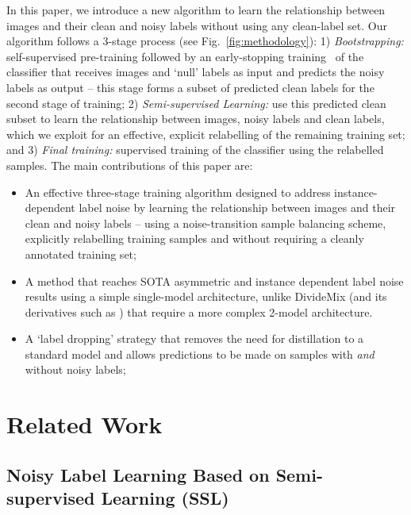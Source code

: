 \documentclass[10pt,twocolumn,letterpaper]{article}
\begin{document}
In this paper, we introduce a new algorithm to learn the relationship between images and their clean and noisy labels without using any clean-label set.
Our algorithm follows a 3-stage process (see Fig.~\ref{fig:methodology}): 
1) \textit{Bootstrapping:} self-supervised pre-training followed by an early-stopping training~\cite{zhang2016understanding} of the classifier that receives images and `null' labels as input and predicts the noisy labels as output -- this stage forms a subset of predicted clean labels for the second stage of training;
2) \textit{Semi-supervised Learning:} use this predicted clean subset to learn the relationship between images, noisy labels and clean labels, which we exploit for an effective, explicit relabelling of the remaining training set;
and 3) \textit{Final training:} supervised training of the classifier using the relabelled samples. The main contributions of this paper are:
\begin{itemize}
    \item An effective three-stage training algorithm designed to address instance-dependent label noise by learning the relationship between images and their clean and noisy labels -- using a noise-transition sample balancing scheme, explicitly relabelling training samples and without requiring a cleanly annotated training set;
    \item A method that reaches SOTA asymmetric and instance dependent label noise results using a simple single-model architecture, unlike DivideMix \cite{li2020dividemix} (and its derivatives such as \cite{sachdeva2021scanmix, zheltonozhskii2022contrast, Nishi_2021_CVPR, cordeiro2021propmix, kim2021fine}) that require a more complex 2-model architecture.
    \item A `label dropping' strategy that removes the need for distillation to a standard model and allows predictions to be made on samples with \textit{and} without noisy labels;
\end{itemize}




\section{Related Work}

\subsection{Noisy Label Learning Based on Semi-supervised Learning (SSL)}
\label{sec:related_work_SSL}
\end{document}
